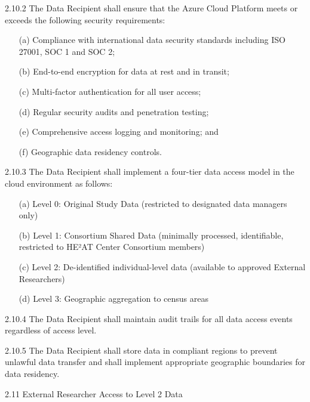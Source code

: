 \documentclass[12pt,letterpaper]{article}
\newcommand{\added}[1]{\textcolor{addcolor}{#1}}
\begin{document}
\added{2.10.2 The Data Recipient shall ensure that the Azure Cloud Platform meets or exceeds the following security requirements:
\begin{enumerate}
\item[(a)] Compliance with international data security standards including ISO 27001, SOC 1 and SOC 2;
\item[(b)] End-to-end encryption for data at rest and in transit;
\item[(c)] Multi-factor authentication for all user access;
\item[(d)] Regular security audits and penetration testing;
\item[(e)] Comprehensive access logging and monitoring; and
\item[(f)] Geographic data residency controls.
\end{enumerate}}

\added{2.10.3 The Data Recipient shall implement a four-tier data access model in the cloud environment as follows:
\begin{enumerate}
\item[(a)] Level 0: Original Study Data (restricted to designated data managers only)
\item[(b)] Level 1: Consortium Shared Data (minimally processed, identifiable, restricted to HE²AT Center Consortium members)
\item[(c)] Level 2: De-identified individual-level data (available to approved External Researchers)
\item[(d)] Level 3: Geographic aggregation to census areas
\end{enumerate}}

\added{2.10.4 The Data Recipient shall maintain audit trails for all data access events regardless of access level.}

\added{2.10.5 The Data Recipient shall store data in compliant regions to prevent unlawful data transfer and shall implement appropriate geographic boundaries for data residency.}

\added{2.11 External Researcher Access to Level 2 Data}
\end{document}
